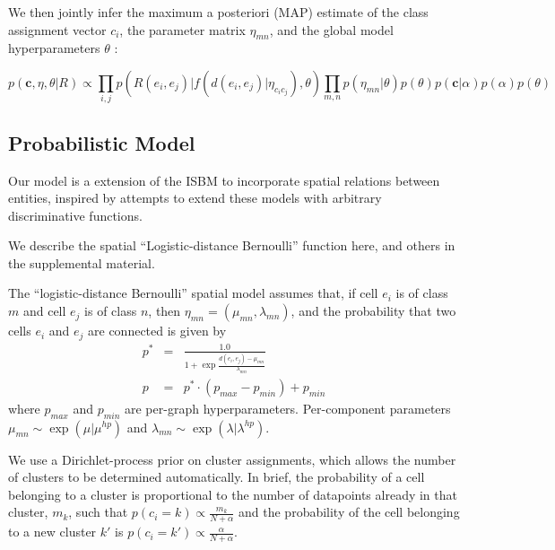 \documentclass{article}
\renewcommand{\vec}[1]{\mathbf{#1}}
\begin{document}
We then jointly infer the maximum a posteriori (MAP) estimate of the
class assignment vector ${c_i}$, the parameter matrix $\eta_{mn}$, and
the global model hyperparameters $\theta$ :

\begin{equation}
  p(\vec{c}, \eta, \theta | R ) \propto \prod_{i, j} p(R(e_i, e_j) | f(d(e_i, e_j) | \eta_{c_ic_j}), \theta) \prod_{m, n} p(\eta_{mn} | \theta)  p(\theta) p(\vec{c} | \alpha) p(\alpha) p(\theta)
\end{equation}




\subsection{Probabilistic Model}

Our model is a extension of the ISBM
\autocite{Kemp2006a,Xu2006} to incorporate spatial relations between entities,
inspired by attempts to extend these models with arbitrary
discriminative functions\autocite{Murphy2012}.


We describe the spatial ``Logistic-distance Bernoulli''  function here,
and others in the supplemental material. 

The ``logistic-distance Bernoulli'' spatial model assumes that, if cell
$e_i$ is of class $m$ and cell $e_j$ is of class $n$, then $\eta_{mn}
= (\mu_{mn}, \lambda_{mn})$, and the probability that two cells $e_i$
and $e_j$ are connected is given by
\begin{eqnarray}
p^* &=& \frac{1.0}{1 + \exp \frac{d(e_i, e_j) - \mu_{mn}}{\lambda_{mn}}}\\
p &= & p^* \cdot (p_{max} - p_{min}) + p_{min}
\end{eqnarray}
where $p_{max}$ and $p_{min}$ are per-graph hyperparameters. Per-component parameters $\mu_{mn} \sim \exp(\mu | \mu^{hp})$ and $\lambda_{mn} \sim \exp(\lambda | \lambda^{hp})$. 

We use a Dirichlet-process prior on cluster assignments, which allows
the number of clusters to be determined automatically. In brief, the
probability of a cell belonging to a cluster is proportional to the
number of datapoints already in that cluster, $m_k$, such that $p(c_i
= k) \propto \frac{m_k}{N + \alpha}$ and the probability of the cell
belonging to a new cluster $k'$ is $p(c_i = k') \propto
\frac{\alpha}{N + \alpha}$.
\end{document}
